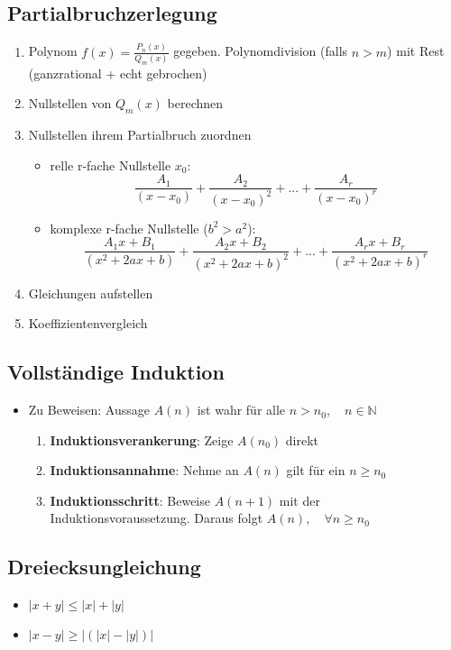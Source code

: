 \documentclass[a3paper, 11pt, landscape]{scrartcl}
\begin{document}
\begin{multicols*}{3}
		\subsection{Partialbruchzerlegung}
		\begin{enumerate}
		    \item Polynom $f(x)=\frac{P_n(x)}{Q_m(x)}$ gegeben. Polynomdivision (falls $n>m$) mit Rest (ganzrational + echt gebrochen)
		    \item Nullstellen von $Q_m(x)$ berechnen
		    \item Nullstellen ihrem Partialbruch zuordnen
		    \begin{itemize}
		        \item relle r-fache Nullstelle $x_0$:\\
		        $$\frac{A_1}{(x-x_0)}+\frac{A_2}{(x-x_0)^2}+...+\frac{A_r}{(x-x_0)^r}$$
		        \item komplexe r-fache Nullstelle ($b^2>a^2$):\\
		        $$\frac{A_1 x+B_1}{(x^2+2ax+b)}+\frac{A_2 x+B_2}{(x^2+2ax+b)^2}+...+\frac{A_r x+B_r}{(x^2+2ax+b)^r}$$
		    \end{itemize}
		    \item Gleichungen aufstellen
		    \item Koeffizientenvergleich
		\end{enumerate}
		
		\subsection{Vollständige Induktion}
		\begin{itemize}
		    \item Zu Beweisen: Aussage $A(n)$ ist wahr für alle $n>n_0, \quad n\in\mathbb{N}$
		    \begin{enumerate}
		        \item \textbf{Induktionsverankerung}: Zeige $A(n_0)$ direkt
		        \item \textbf{Induktionsannahme}: Nehme an $A(n)$ gilt für ein $n\geq n_0$
		        \item \textbf{Induktionsschritt}: Beweise $A(n+1)$ mit der Induktionsvoraussetzung. Daraus folgt $A(n),\quad \forall n \geq n_0$
		    \end{enumerate}
		\end{itemize}
		
		\subsection{Dreiecksungleichung}
		\begin{itemize}
		    \item $|x + y| \leq |x|+|y|$
		    \item $|x-y| \geq | (|x|-|y|) |$
		\end{itemize}
		

\end{multicols*}
\end{document}
